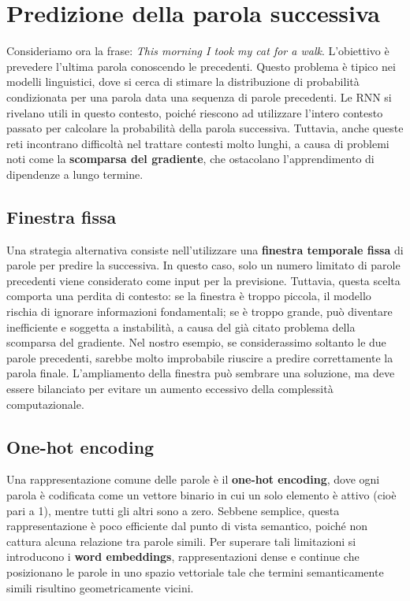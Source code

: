 \section{Predizione della parola successiva}

Consideriamo ora la frase: \textit{This morning I took my cat for a walk}. L'obiettivo è prevedere l'ultima parola conoscendo le precedenti. Questo problema è tipico nei modelli linguistici, dove si cerca di stimare la distribuzione di probabilità condizionata per una parola data una sequenza di parole precedenti. Le RNN si rivelano utili in questo contesto, poiché riescono ad utilizzare l'intero contesto passato per calcolare la probabilità della parola successiva. Tuttavia, anche queste reti incontrano difficoltà nel trattare contesti molto lunghi, a causa di problemi noti come la \textbf{scomparsa del gradiente}, che ostacolano l’apprendimento di dipendenze a lungo termine.

\subsection{Finestra fissa}

Una strategia alternativa consiste nell'utilizzare una \textbf{finestra temporale fissa} di parole per predire la successiva. In questo caso, solo un numero limitato di parole precedenti viene considerato come input per la previsione. Tuttavia, questa scelta comporta una perdita di contesto: se la finestra è troppo piccola, il modello rischia di ignorare informazioni fondamentali; se è troppo grande, può diventare inefficiente e soggetta a instabilità, a causa del già citato problema della scomparsa del gradiente. Nel nostro esempio, se considerassimo soltanto le due parole precedenti, sarebbe molto improbabile riuscire a predire correttamente la parola finale. L’ampliamento della finestra può sembrare una soluzione, ma deve essere bilanciato per evitare un aumento eccessivo della complessità computazionale.

\subsection{One-hot encoding}

Una rappresentazione comune delle parole è il \textbf{one-hot encoding}, dove ogni parola è codificata come un vettore binario in cui un solo elemento è attivo (cioè pari a 1), mentre tutti gli altri sono a zero. Sebbene semplice, questa rappresentazione è poco efficiente dal punto di vista semantico, poiché non cattura alcuna relazione tra parole simili. Per superare tali limitazioni si introducono i \textbf{word embeddings}, rappresentazioni dense e continue che posizionano le parole in uno spazio vettoriale tale che termini semanticamente simili risultino geometricamente vicini.


